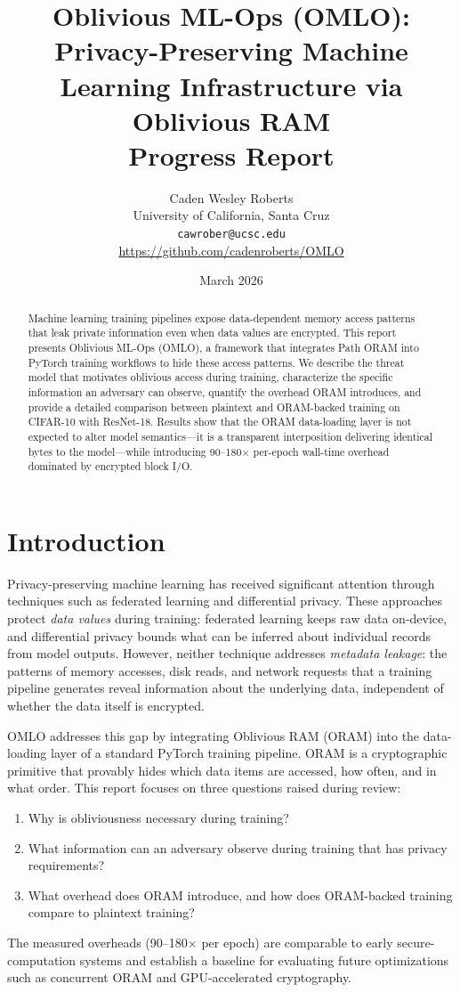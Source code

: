\documentclass[11pt]{article}
\title{\textbf{Oblivious ML-Ops (OMLO): Privacy-Preserving Machine Learning Infrastructure via Oblivious RAM} \\ \vspace{0.3em} \large Progress Report}
\author{Caden Wesley Roberts \\ University of California, Santa Cruz \\ \texttt{cawrober@ucsc.edu} \\ \url{https://github.com/cadenroberts/OMLO}}
\date{March 2026}
\begin{document}
\maketitle

\begin{abstract}
Machine learning training pipelines expose data-dependent memory access patterns that leak private information even when data values are encrypted.
This report presents Oblivious ML-Ops (OMLO), a framework that integrates Path ORAM into PyTorch training workflows to hide these access patterns.
We describe the threat model that motivates oblivious access during training, characterize the specific information an adversary can observe, quantify the overhead ORAM introduces, and provide a detailed comparison between plaintext and ORAM-backed training on CIFAR-10 with ResNet-18.
Results show that the ORAM data-loading layer is not expected to alter model semantics---it is a transparent interposition delivering identical bytes to the model---while introducing 90--180$\times$ per-epoch wall-time overhead dominated by encrypted block I/O.
\end{abstract}

\section{Introduction}

Privacy-preserving machine learning has received significant attention through techniques such as federated learning and differential privacy.
These approaches protect \emph{data values} during training: federated learning keeps raw data on-device, and differential privacy bounds what can be inferred about individual records from model outputs.
However, neither technique addresses \emph{metadata leakage}: the patterns of memory accesses, disk reads, and network requests that a training pipeline generates reveal information about the underlying data, independent of whether the data itself is encrypted.

OMLO addresses this gap by integrating Oblivious RAM (ORAM) into the data-loading layer of a standard PyTorch training pipeline.
ORAM is a cryptographic primitive that provably hides which data items are accessed, how often, and in what order.
This report focuses on three questions raised during review:
\begin{enumerate}[label=(\arabic*)]
    \item Why is obliviousness necessary during training?
    \item What information can an adversary observe during training that has privacy requirements?
    \item What overhead does ORAM introduce, and how does ORAM-backed training compare to plaintext training?
\end{enumerate}
The measured overheads (90--180$\times$ per epoch) are comparable to early secure-computation systems and establish a baseline for evaluating future optimizations such as concurrent ORAM and GPU-accelerated cryptography.
\end{document}
